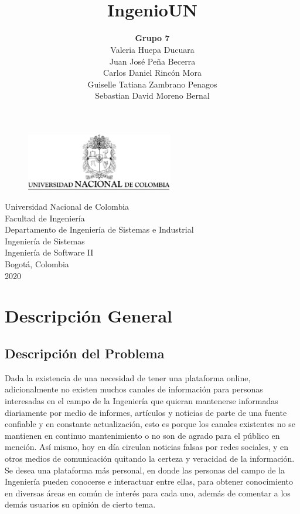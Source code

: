 \documentclass[a4paper,12 pt]{article}
\title{\LARGE \textbf{\\[0.5cm] IngenioUN\\[2.5cm]}}
\author{\textbf{Grupo 7}\\[0.5cm]
        Valeria Huepa Ducuara\\
        Juan José Peña Becerra\\
        Carlos Daniel Rincón Mora\\
        Guiselle Tatiana Zambrano Penagos\\[2.5cm]
        Sebastian David Moreno Bernal\\[2.5cm]}
\date{}
\begin{document}
\newpage

\begin{figure}
    \centering
    \includegraphics[width=0.57\textwidth]{images/escudoUN.png}
\end{figure}
\maketitle 
\thispagestyle{empty}

\begin{center}
    \small Universidad Nacional de Colombia\\
    Facultad de Ingeniería\\
    Departamento de Ingeniería de Sistemas e Industrial\\
    Ingeniería de Sistemas\\
    Ingeniería de Software II\\
    Bogotá, Colombia\\
    2020
\end{center}
\newpage
\tableofcontents %
\thispagestyle{empty}

\newpage
\setcounter{page}{1}
\pagestyle{plain}

\section{Descripción General}


\subsection{Descripción del Problema}

Dada la existencia de una necesidad de tener una plataforma online,
adicionalmente no existen muchos canales de información para personas
interesadas en el campo de la Ingeniería que quieran mantenerse informadas
diariamente por medio de informes, artículos y noticias de parte de una fuente
confiable y en constante actualización, esto es porque los canales existentes no
se mantienen en continuo mantenimiento o no son de agrado para el público en
mención. Así mismo, hoy en día circulan noticias falsas por redes sociales, y en
otros medios de comunicación quitando la certeza y veracidad de la información.
Se desea una plataforma más personal, en donde las personas del campo de la
Ingeniería pueden conocerse e interactuar entre ellas, para obtener conocimiento
en diversas áreas en común de interés para cada uno, además de comentar a los
demás usuarios su opinión de cierto tema.\\
\end{document}
